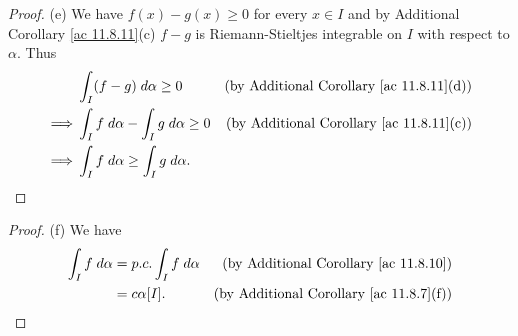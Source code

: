\begin{proof}{(e)}
    We have \(f(x) - g(x) \geq 0\) for every \(x \in I\) and by Additional Corollary \ref{ac 11.8.11}(c) \(f - g\) is Riemann-Stieltjes integrable on \(I\) with respect to \(\alpha\).
    Thus
    \begin{align*}
                 & \int_I (f - g) \; d \alpha \geq 0                  & \text{(by Additional Corollary \ref{ac 11.8.11}(d))} \\
        \implies & \int_I f \; d \alpha - \int_I g \; d \alpha \geq 0 & \text{(by Additional Corollary \ref{ac 11.8.11}(c))} \\
        \implies & \int_I f \; d \alpha \geq \int_I g \; d \alpha.
    \end{align*}
\end{proof}

\begin{proof}{(f)}
    We have
    \begin{align*}
        \int_I f \; d \alpha & = p.c. \int_I f \; d \alpha & \text{(by Additional Corollary \ref{ac 11.8.10})}   \\
                             & = c \alpha[I].              & \text{(by Additional Corollary \ref{ac 11.8.7}(f))}
    \end{align*}
\end{proof}

